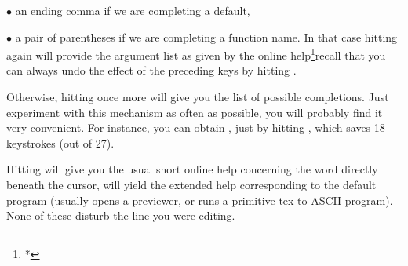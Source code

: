 $\bullet$ an ending comma if we are completing a default,

$\bullet$ a pair of parentheses if we are completing a function name. In
that case hitting  again will provide the argument list as given
by the online help\footnote{*}{recall that you can always undo the effect
of the preceding keys by hitting }.

Otherwise, hitting  once more will give you the list of possible
completions. Just experiment with this mechanism as often as possible,
you will probably find it very convenient. For instance, you can obtain
, just by hitting ,
which saves 18 keystrokes (out of 27).

  Hitting  will give you the usual short online help concerning the
word directly beneath the cursor,  will yield the extended help
corresponding to the  default program (usually opens a 
previewer, or runs a primitive tex-to-ASCII program). None of these disturb
the line you were editing.
\vfill\eject

